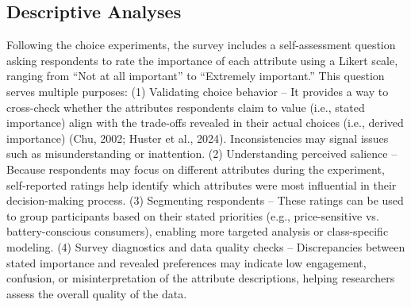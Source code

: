 \documentclass[a4paper,fleqn]{cas-sc}   %
\begin{document}
\subsection{Descriptive Analyses}

Following the choice experiments, the survey includes a self-assessment question asking respondents to rate the importance of each attribute using a Likert scale, ranging from “Not at all important” to “Extremely important.” This question serves multiple purposes: (1) Validating choice behavior – It provides a way to cross-check whether the attributes respondents claim to value (i.e., stated importance) align with the trade-offs revealed in their actual choices (i.e., derived importance) (Chu, 2002; Huster et al., 2024). Inconsistencies may signal issues such as misunderstanding or inattention. (2) Understanding perceived salience – Because respondents may focus on different attributes during the experiment, self-reported ratings help identify which attributes were most influential in their decision-making process. (3) Segmenting respondents – These ratings can be used to group participants based on their stated priorities (e.g., price-sensitive vs. battery-conscious consumers), enabling more targeted analysis or class-specific modeling. (4) Survey diagnostics and data quality checks – Discrepancies between stated importance and revealed preferences may indicate low engagement, confusion, or misinterpretation of the attribute descriptions, helping researchers assess the overall quality of the data.



\end{document}
